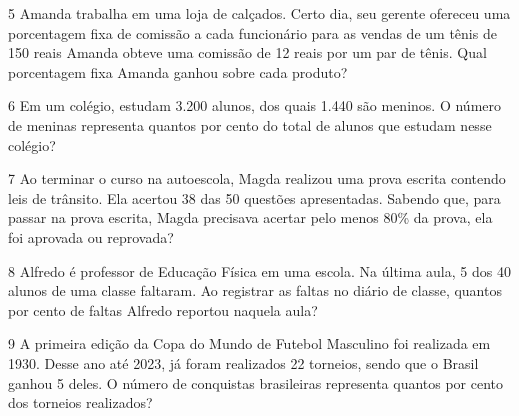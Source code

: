 \num{5} Amanda trabalha em uma loja de calçados. Certo dia, seu gerente
ofereceu uma porcentagem fixa de comissão a cada funcionário para as vendas de
um tênis de 150 reais Amanda obteve uma comissão de 12 reais por um par de tênis.
Qual porcentagem fixa Amanda ganhou sobre cada produto?




\num{6} Em um colégio, estudam 3.200 alunos, dos quais 1.440 são meninos. O
número de meninas representa quantos por cento do total de alunos que estudam
nesse colégio?




\num{7} Ao terminar o curso na autoescola, Magda realizou uma prova escrita
contendo leis de trânsito. Ela acertou 38 das 50 questões apresentadas.
Sabendo que, para passar na prova escrita, Magda precisava acertar pelo
menos 80\% da prova, ela foi aprovada ou reprovada?




\num{8} Alfredo é professor de Educação Física em uma escola. Na última aula,
5 dos 40 alunos de uma classe faltaram. Ao registrar as faltas no diário
de classe, quantos por cento de faltas Alfredo reportou naquela aula?




\num{9} A primeira edição da Copa do Mundo de Futebol Masculino foi realizada
em 1930. Desse ano até 2023, já foram realizados 22 torneios, sendo que
o Brasil ganhou 5 deles. O número de conquistas brasileiras representa
quantos por cento dos torneios realizados?

